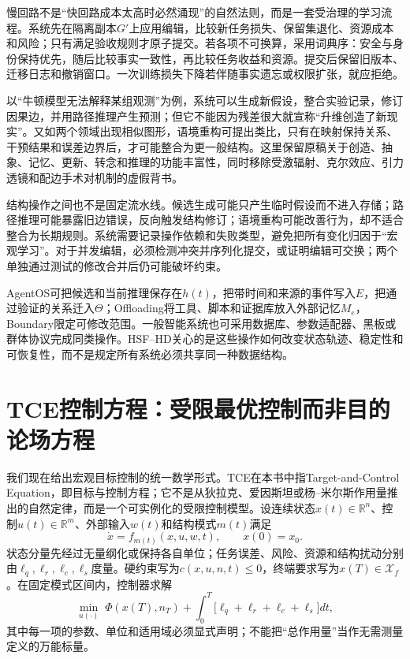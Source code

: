 慢回路不是“快回路成本太高时必然涌现”的自然法则，而是一套受治理的学习流程。系统先在隔离副本$G'$上应用编辑，比较新任务损失、保留集退化、资源成本和风险；只有满足验收规则才原子提交。若各项不可换算，采用词典序：安全与身份保持优先，随后比较事实一致性，再比较任务收益和资源。提交后保留旧版本、迁移日志和撤销窗口。一次训练损失下降若伴随事实遗忘或权限扩张，就应拒绝。

以“牛顿模型无法解释某组观测”为例，系统可以生成新假设，整合实验记录，修订因果边，并用路径推理产生预测；但它不能因为残差很大就宣称“升维创造了新现实”。又如两个领域出现相似图形，语境重构可提出类比，只有在映射保持关系、干预结果和误差边界后，才可能整合为更一般结构。这里保留原稿关于创造、抽象、记忆、更新、转念和推理的功能丰富性，同时移除受激辐射、克尔效应、引力透镜和配边手术对机制的虚假背书。

结构操作之间也不是固定流水线。候选生成可能只产生临时假设而不进入存储；路径推理可能暴露旧边错误，反向触发结构修订；语境重构可能改善行为，却不适合整合为长期规则。系统需要记录操作依赖和失败类型，避免把所有变化归因于“宏观学习”。对于并发编辑，必须检测冲突并序列化提交，或证明编辑可交换；两个单独通过测试的修改合并后仍可能破坏约束。

AgentOS可把候选和当前推理保存在$h(t)$，把带时间和来源的事件写入$E$，把通过验证的关系迁入$\Theta$；Offloading将工具、脚本和证据库放入外部记忆$M_e$，Boundary限定可修改范围。一般智能系统也可采用数据库、参数适配器、黑板或群体协议完成同类操作。HSF--HD关心的是这些操作如何改变状态轨迹、稳定性和可恢复性，而不是规定所有系统必须共享同一种数据结构。

\section{TCE控制方程：受限最优控制而非目的论场方程}
\label{sec:section_6878}

我们现在给出宏观目标控制的统一数学形式。TCE在本书中指Target-and-Control Equation，即目标与控制方程；它不是从狄拉克、爱因斯坦或杨--米尔斯作用量推出的自然定律，而是一个可实例化的受限控制模型。设连续状态$x(t)\in\mathbb{R}^{n}$、控制$u(t)\in\mathbb{R}^{m}$、外部输入$w(t)$和结构模式$m(t)$满足
\[
\dot x=f_{m(t)}(x,u,w,t),\qquad x(0)=x_0 .
\]
状态分量先经过无量纲化或保持各自单位；任务误差、风险、资源和结构扰动分别由$\ell_q,\ell_r,\ell_c,\ell_s$度量。硬约束写为$c(x,u,n,t)\le0$，终端要求写为$x(T)\in\mathcal{X}_f$。在固定模式区间内，控制器求解
\[
\min_{u(\cdot)}\;\Phi(x(T),n_T)+\int_0^T
\bigl[\ell_q+\ell_r+\ell_c+\ell_s\bigr]dt ,
\]
其中每一项的参数、单位和适用域必须显式声明；不能把“总作用量”当作无需测量定义的万能标量。

